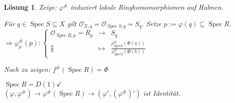 \documentclass[paper = A4, fontsize=12pt, numbers=noendperiod, chapterprefix=true]{scrbook}
\theoremstyle{break}
\newtheorem{Loes}{L\"osung}
\theoremstyle{nonumberbreak}
\theoremstyle{nonumberplain}
\DeclareMathOperator{\Spec}{Spec}
\newcommand{\calO}{\mathcal{O}}
\begin{document}
\begin{Loes}
\emph{Zeige:} $\varphi^\#$ induziert lokale Ringhomomorphismen auf Halmen.

F\"ur $q \in \Spec S \subseteq X$ gilt $\calO_{X,q} = \calO_{\Spec S, q} = S_q$. Setze $p:= \varphi(q) \subseteq \Spec R$.\\
$\Rightarrow \varphi_p^\#(p): \left\{ \begin{array}{rcl} \calO_{\Spec R, p} = R_p &\to& S_q \\ \frac{a}{b} &\mapsto& \frac{\rho_{Spec S}^X (\Phi(a))}{\rho_{Spec S}^X (\Phi(b))} \end{array}\right.$

\emph{Noch zu zeigen:} $f^\#(\Spec R) = \Phi$

$\Spec R = D(1) \checkmark$\\
$(\varphi, \varphi^\#) \to \varphi^\#(\Spec R) \to (\varphi', (\varphi^{\#})' )$ ist Identit\"at.
\end{Loes}
\end{document}
